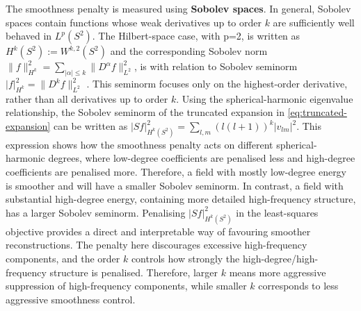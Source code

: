 \documentclass[11pt,a4paper]{report}
\begin{document}
The smoothness penalty is measured using \textbf{Sobolev spaces}. In general, Sobolev spaces contain functions whose weak derivatives up to order $k$ are sufficiently well behaved in $L^p(S^2)$. The Hilbert-space case, with p=2, is written as $H^k(S^2):=W^{k,2}(S^2)$ and the corresponding Sobolev norm $\|f\|_{H^k}^2 = \sum_{|\alpha|\le k}\|D^\alpha f\|^2_{L^2}$, is
with relation to Sobolev seminorm $|f|_{H^k}^2 = \|D^k f\|^2_{L^2}$ . This seminorm focuses only on the highest-order derivative, rather than all derivatives up to order $k$. Using the spherical-harmonic eigenvalue relationship, the Sobolev seminorm of the truncated expansion in \cref{eq:truncated-expansion} can be written as $|Sf|^2_{H^k(S^2)} = \sum_{l,m}(l(l+1))^k|v_{lm}|^2$. This expression shows how the smoothness penalty acts on different spherical-harmonic degrees, where low-degree coefficients are penalised less and high-degree coefficients are penalised more. Therefore, a field with mostly low-degree energy is smoother and will have a smaller Sobolev seminorm. In contrast, a field with substantial high-degree energy, containing more detailed high-frequency structure, has a larger Sobolev seminorm. Penalising $|Sf|^2_{H^k(S^2)}$ in the least-squares objective provides a direct and interpretable way of favouring smoother reconstructions. The penalty here discourages excessive high-frequency components, and the order $k$ controls how strongly the high-degree/high-frequency structure is penalised. Therefore, larger $k$ means more aggressive suppression of high-frequency components, while smaller $k$ corresponds to less aggressive smoothness control. 
 
\end{document}
